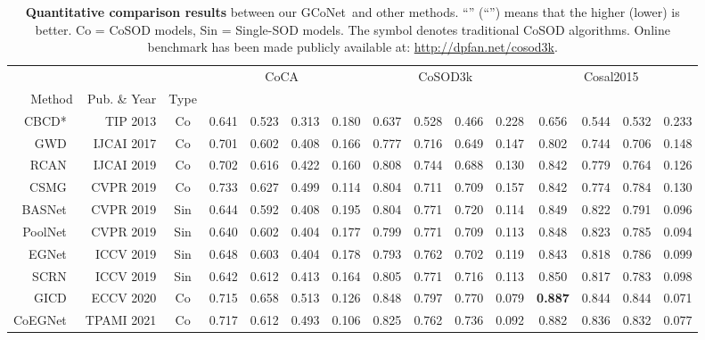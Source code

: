 \documentclass[final]{cvpr}
\def\ourmodel{GCoNet}
\begin{document}
\begin{table*}
\begin{center}
\footnotesize
\renewcommand{\arraystretch}{}
\renewcommand{\tabcolsep}{1.2mm}
\caption{\textbf{Quantitative comparison results} between our \ourmodel~and other methods. ``'' (``'') means that the higher (lower) is better. Co = CoSOD models, Sin = Single-SOD models.
The symbol  denotes traditional CoSOD algorithms.  Online benchmark has been made publicly available at: \url{http://dpfan.net/cosod3k}.
}
\label{table:coco}
\begin{tabular}{r||r|c|cccc|cccc|cccc}
\hline
& & &\multicolumn{4}{|c|}{CoCA~\cite{zhang2020gradient}} & \multicolumn{4}{|c|}{CoSOD3k~\cite{deng2020re}} & \multicolumn{4}{|c}{Cosal2015~\cite{zhang2016detection}} \\
Method & Pub. \& Year & Type &  &  &  &  &  &  &  &  &  &  &  &  \\
\hline
CBCD*~\cite{fu2013cluster} & TIP 2013 &	 Co & 0.641 & 0.523 & 0.313 & 0.180 & 0.637 & 0.528 & 0.466 & 0.228 & 0.656 & 0.544 & 0.532 & 0.233 \\
GWD~\cite{wei2017group} & IJCAI 2017 & Co & 0.701 & 0.602 & 0.408 & 0.166 & 0.777 & 0.716 & 0.649 & 0.147 & 0.802 & 0.744 & 0.706 & 0.148 \\
RCAN~\cite{li2019detecting} & IJCAI 2019 & Co & 0.702 & 0.616 & 0.422 & 0.160 & 0.808 & 0.744 & 0.688 & 0.130 & 0.842 & 0.779 & 0.764 & 0.126 \\
CSMG~\cite{zhang2019co} & CVPR 2019 & Co & 0.733 & 0.627 & 0.499 & 0.114 & 0.804 & 0.711 & 0.709 & 0.157 & 0.842 & 0.774 & 0.784 & 0.130 \\
BASNet~\cite{qin2019basnet} & CVPR 2019 & Sin & 0.644 & 0.592 & 0.408 & 0.195 & 0.804 & 0.771 & 0.720 & 0.114 & 0.849 & 0.822 & 0.791 & 0.096 \\
PoolNet~\cite{liu2019simple} & CVPR 2019 & Sin & 0.640 & 0.602 & 0.404 & 0.177 & 0.799 & 0.771 & 0.709 & 0.113 & 0.848 & 0.823 & 0.785 & 0.094 \\
EGNet~\cite{zhao2019egnet} & ICCV 2019& Sin & 0.648 & 0.603 & 0.404 & 0.178 & 0.793 & 0.762 & 0.702 & 0.119 & 0.843 & 0.818 & 0.786 & 0.099 \\
SCRN~\cite{wu2019stacked} & ICCV 2019 & Sin & 0.642 & 0.612 & 0.413 & 0.164 & 0.805 & 0.771 & 0.716 & 0.113 & 0.850 & 0.817 & 0.783 & 0.098 \\
GICD~\cite{zhang2020gradient} & ECCV 2020 & Co & 0.715 & 0.658 & 0.513 & 0.126 & 0.848 & 0.797 & 0.770 & 0.079 & \textbf{0.887} & 0.844 & 0.844 & 0.071 \\
CoEGNet~\cite{deng2020re} & TPAMI 2021 &	Co  & 0.717 & 0.612 & 0.493 & 0.106 & 0.825 & 0.762 & 0.736 & 0.092 & 0.882 & 0.836 & 0.832 & 0.077 \\
\hline



\end{tabular}
\end{center}
\end{table*}
\end{document}
